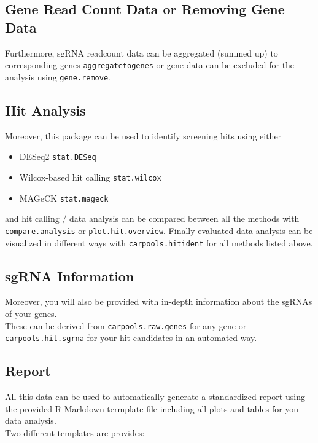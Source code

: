 \documentclass[]{article}
\providecommand{\tightlist}{%
  \setlength{\itemsep}{0pt}\setlength{\parskip}{0pt}}
\begin{document}
\subsection{Gene Read Count Data or Removing Gene
Data}\label{gene-read-count-data-or-removing-gene-data}

Furthermore, sgRNA readcount data can be aggregated (summed up) to
corresponding genes \texttt{aggregatetogenes} or gene data can be
excluded for the analysis using \texttt{gene.remove}.

\subsection{Hit Analysis}\label{hit-analysis}

Moreover, this package can be used to identify screening hits using
either

\begin{itemize}
\tightlist
\item
  DESeq2 \texttt{stat.DESeq}
\item
  Wilcox-based hit calling \texttt{stat.wilcox}
\item
  MAGeCK \texttt{stat.mageck}
\end{itemize}

and hit calling / data analysis can be compared between all the methods
with \texttt{compare.analysis} or \texttt{plot.hit.overview}. Finally
evaluated data analysis can be visualized in different ways with
\texttt{carpools.hitident} for all methods listed above.

\subsection{sgRNA Information}\label{sgrna-information}

Moreover, you will also be provided with in-depth information about the
sgRNAs of your genes.\\
These can be derived from \texttt{carpools.raw.genes} for any gene or
\texttt{carpools.hit.sgrna} for your hit candidates in an automated way.

\subsection{Report}\label{report}

All this data can be used to automatically generate a standardized
report using the provided R Markdown termplate file including all plots
and tables for you data analysis.\\
Two different templates are provides:
\end{document}

